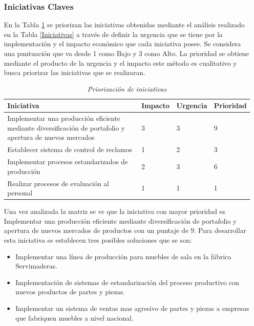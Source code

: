 \documentclass[12pt, a4paper]{article}
\begin{document}
\subsubsection{Iniciativas Claves}
En la  Tabla \ref{Priorizacion:Iniciativas} se priorizan las iniciativas obtenidas mediante el análisis realizado en la Tabla \ref{Iniciativas} a través de definir la urgencia que se tiene por la implementación y el impacto económico que cada iniciativa posee. Se considera una puntuación que va desde 1 como Bajo y 3 como Alto. La prioridad se obtiene mediante el producto de la urgencia y el impacto este método es cualitativo y busca priorizar las iniciativas que se realizaran.

\begin{table}[H]
\centering
\caption{\textit{ Priorización de iniciativas} }
\label{Priorizacion:Iniciativas}
\begin{tabular}{|p{5cm}|l|l|l|}
\hline
\textbf{Iniciativa} & \textbf{Impacto} & \textbf{Urgencia} & \textbf{Prioridad} \\ \hline
Implementar una producción eficiente mediante diversificación de portafolio y apertura de nuevos mercados & 3 & 3 & 9 \\ \hline
Establecer sistema de control de reclamos & 1 & 2 & 3 \\ \hline
Implementar procesos estandarizados de producción & 2 & 3 & 6 \\ \hline
Realizar procesos de evaluación al personal & 1 & 1 & 1 \\ \hline
\end{tabular}
\end{table}

Una vez analizada la matriz se ve que la iniciativa con mayor  prioridad es Implementar una producción eficiente mediante diversificación de portafolio y apertura de nuevos mercados de productos con un puntaje de 9. Para desarrollar esta iniciativa se establecen tres posibles soluciones que se son:

\begin{itemize}
\item Implementar una línea de producción para muebles de sala en la fábrica Servimaderas.
\item Implementación de sistemas de estandarización del proceso productivo con nuevos productos de partes y piezas.
\item Implementar un sistema de ventas mas agresivo de partes y piezas a empresas que fabriquen muebles a nivel nacional.
\end{itemize}
\end{document}
